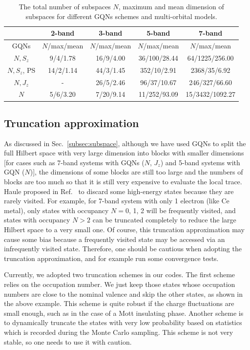 \begin{table}[t]
\caption{The total number of subspaces $N$, maximum and mean dimension of subspaces for different GQNs schemes and multi-orbital models. \label{table:dim}} 
\centering
\begin{tabular}{ccccc}
\hline
\hline
                & 2-band       & 3-band       & 5-band       & 7-band          \\
\hline
GQNs            & $N$/max/mean & $N$/max/mean & $N$/max/mean & $N$/max/mean    \\ 
\hline
$N, S_{z}$      &  9/4/1.78    & 16/9/4.00    & 36/100/28.44 & 64/1225/256.00  \\
$N, S_{z}$, PS  &  14/2/1.14   & 44/3/1.45    & 352/10/2.91  & 2368/35/6.92    \\
$N, J_{z}$      &  -           & 26/5/2.46    & 96/37/10.67  & 246/327/66.60   \\
$N$             &  5/6/3.20    & 7/20/9.14    & 11/252/93.09 & 15/3432/1092.27 \\ 
\hline
\hline
\end{tabular}
\end{table}

\subsection{Truncation approximation}
As discussed in Sec.~\ref{subsec:subspace}, although we have used GQNs to split the full Hilbert space with very large dimension into blocks with smaller dimensions [for cases such as 7-band systems with GQNs ($N$, $J_{z}$) and 5-band systems with GQN ($N$)], the dimensions of some blocks are still too large and the numbers of blocks are too much so that it is still very expensive to evaluate the local trace. Haule proposed in Ref.~\cite{PhysRevB.75.155113} to discard some high-energy states because they are rarely visited. For example, for 7-band system with only 1 electron (like Ce metal), only states with occupancy $N=0$, 1, 2 will be frequently visited, and states with occupancy $N>2$ can be truncated completely to reduce the large Hilbert space to a very small one. Of course, this truncation approximation may cause some bias because a frequently visited state may be accessed via an infrequently visited state. Therefore, one should be cautious when adopting the truncation approximation, and for example run some convergence tests. 

Currently, we adopted two truncation schemes in our codes. The first scheme relies on the occupation number. We just keep those states whose occupation numbers are close to the nominal valence and skip the other states, as shown in the above example. This scheme is quite robust if the charge fluctuations are small enough, such as in the case of a Mott insulating phase. Another scheme is to dynamically truncate the states with very low probability based on statistics which is recorded during the Monte Carlo sampling. This scheme is not very stable, so one needs to use it with caution.

